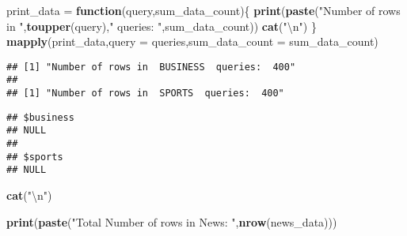 \documentclass[]{article}
\newenvironment{Shaded}{\begin{snugshade}}{\end{snugshade}}
\newcommand{\KeywordTok}[1]{\textcolor[rgb]{0.13,0.29,0.53}{\textbf{#1}}}
\newcommand{\DataTypeTok}[1]{\textcolor[rgb]{0.13,0.29,0.53}{#1}}
\newcommand{\DecValTok}[1]{\textcolor[rgb]{0.00,0.00,0.81}{#1}}
\newcommand{\CharTok}[1]{\textcolor[rgb]{0.31,0.60,0.02}{#1}}
\newcommand{\StringTok}[1]{\textcolor[rgb]{0.31,0.60,0.02}{#1}}
\newcommand{\CommentTok}[1]{\textcolor[rgb]{0.56,0.35,0.01}{\textit{#1}}}
\newcommand{\ControlFlowTok}[1]{\textcolor[rgb]{0.13,0.29,0.53}{\textbf{#1}}}
\newcommand{\NormalTok}[1]{#1}
\begin{document}
\begin{Shaded}
\end{Shaded}

\begin{Shaded}
\begin{Highlighting}[]
\NormalTok{print_data =}\StringTok{ }\ControlFlowTok{function}\NormalTok{(query,sum_data_count)\{}
  \KeywordTok{print}\NormalTok{(}\KeywordTok{paste}\NormalTok{(}\StringTok{"Number of rows in "}\NormalTok{,}\KeywordTok{toupper}\NormalTok{(query),}\StringTok{" queries: "}\NormalTok{,sum_data_count))}
  \KeywordTok{cat}\NormalTok{(}\StringTok{"}\CharTok{\textbackslash{}n}\StringTok{"}\NormalTok{)}
\NormalTok{\}}
\KeywordTok{mapply}\NormalTok{(print_data,}\DataTypeTok{query =}\NormalTok{ queries,}\DataTypeTok{sum_data_count =}\NormalTok{ sum_data_count)}
\end{Highlighting}
\end{Shaded}

\begin{verbatim}
## [1] "Number of rows in  BUSINESS  queries:  400"
## 
## [1] "Number of rows in  SPORTS  queries:  400"
\end{verbatim}

\begin{verbatim}
## $business
## NULL
## 
## $sports
## NULL
\end{verbatim}

\begin{Shaded}
\begin{Highlighting}[]
\KeywordTok{cat}\NormalTok{(}\StringTok{"}\CharTok{\textbackslash{}n}\StringTok{"}\NormalTok{)}
\end{Highlighting}
\end{Shaded}

\begin{Shaded}
\begin{Highlighting}[]
\KeywordTok{print}\NormalTok{(}\KeywordTok{paste}\NormalTok{(}\StringTok{"Total Number of rows in News: "}\NormalTok{,}\KeywordTok{nrow}\NormalTok{(news_data)))}
\end{Highlighting}
\end{Shaded}
\end{document}
